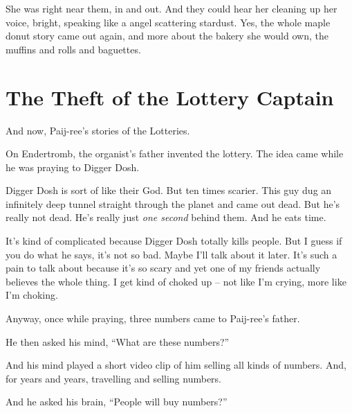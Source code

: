 \documentclass[10pt,twoside]{report}
\begin{document}
She was right near them, in and out.  And they could hear her cleaning
up her voice, bright, speaking like a angel scattering stardust. Yes,
the whole maple donut story came out again, and more about the bakery
she would own, the muffins and rolls and baguettes.

\newpage


\section{The Theft of the Lottery Captain}




And now, Paij-ree's stories of the Lotteries.

On Endertromb, the organist's father invented the lottery.  The idea
came while he was praying to Digger Dosh.

Digger Dosh is sort of like their God.  But ten times scarier.  This
guy dug an infinitely deep tunnel straight through the planet and came
out dead. But he's really not dead.  He's really just {\em one second}
behind them.  And he eats time.

It's kind of complicated because Digger Dosh totally kills people.
But I guess if you do what he says, it's not so bad.  Maybe I'll talk
about it later.  It's such a pain to talk about because it's so scary
and yet one of my friends actually believes the whole thing.  I get
kind of choked up -- not like I'm crying, more like I'm choking.

Anyway, once while praying, three numbers came to Paij-ree's father.

He then asked his mind, ``What are these numbers?''

And his mind played a short video clip of him selling all kinds of
numbers.  And, for years and years, travelling and selling numbers.

And he asked his brain, ``People will buy numbers?''
\end{document}
